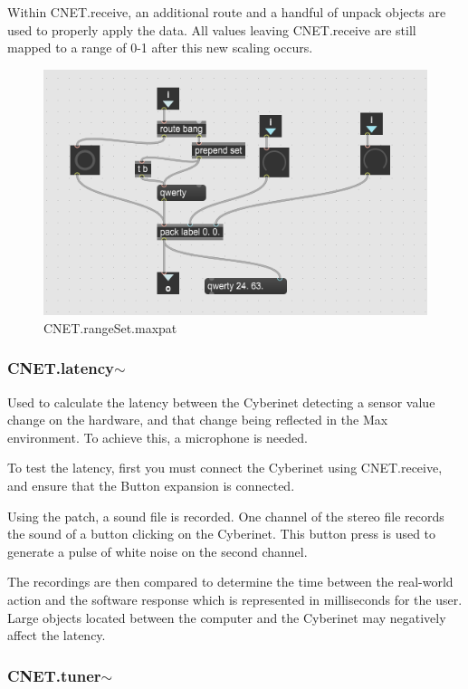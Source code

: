 Within CNET.receive, an additional route and a handful of unpack objects are used to properly apply the data. All values leaving CNET.receive are still mapped to a range of 0-1 after this new scaling occurs.

\begin{figure}
    \centering
    \includegraphics{diagrams/maxPatches/CNET.rangeSet.png}
    \caption{CNET.rangeSet.maxpat}
    \label{fig:CNET.rangeSet.maxpatch}
\end{figure}

\subsubsection{CNET.latency$\sim$}
Used to calculate the latency between the Cyberinet detecting a sensor value change on the hardware, and that change being reflected in the Max environment. To achieve this, a microphone is needed. 

To test the latency, first you must connect the Cyberinet using CNET.receive, and ensure that the Button expansion is connected. 

Using the patch, a sound file is recorded. One channel of the stereo file records the sound of a button clicking on the Cyberinet. This button press is used to generate a pulse of white noise on the second channel.

The recordings are then compared to determine the time between the real-world action and the software response which is represented in milliseconds for the user. Large objects located between the computer and the Cyberinet may negatively affect the latency.

\subsubsection{CNET.tuner$\sim$}

